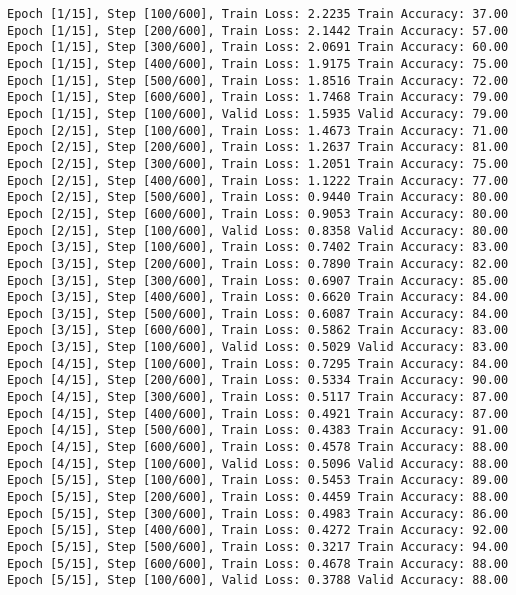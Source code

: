 \documentclass[11pt]{article}
\begin{document}
    \begin{Verbatim}[commandchars=\\\{\}]
Epoch [1/15], Step [100/600], Train Loss: 2.2235 Train Accuracy: 37.00
Epoch [1/15], Step [200/600], Train Loss: 2.1442 Train Accuracy: 57.00
Epoch [1/15], Step [300/600], Train Loss: 2.0691 Train Accuracy: 60.00
Epoch [1/15], Step [400/600], Train Loss: 1.9175 Train Accuracy: 75.00
Epoch [1/15], Step [500/600], Train Loss: 1.8516 Train Accuracy: 72.00
Epoch [1/15], Step [600/600], Train Loss: 1.7468 Train Accuracy: 79.00
Epoch [1/15], Step [100/600], Valid Loss: 1.5935 Valid Accuracy: 79.00
Epoch [2/15], Step [100/600], Train Loss: 1.4673 Train Accuracy: 71.00
Epoch [2/15], Step [200/600], Train Loss: 1.2637 Train Accuracy: 81.00
Epoch [2/15], Step [300/600], Train Loss: 1.2051 Train Accuracy: 75.00
Epoch [2/15], Step [400/600], Train Loss: 1.1222 Train Accuracy: 77.00
Epoch [2/15], Step [500/600], Train Loss: 0.9440 Train Accuracy: 80.00
Epoch [2/15], Step [600/600], Train Loss: 0.9053 Train Accuracy: 80.00
Epoch [2/15], Step [100/600], Valid Loss: 0.8358 Valid Accuracy: 80.00
Epoch [3/15], Step [100/600], Train Loss: 0.7402 Train Accuracy: 83.00
Epoch [3/15], Step [200/600], Train Loss: 0.7890 Train Accuracy: 82.00
Epoch [3/15], Step [300/600], Train Loss: 0.6907 Train Accuracy: 85.00
Epoch [3/15], Step [400/600], Train Loss: 0.6620 Train Accuracy: 84.00
Epoch [3/15], Step [500/600], Train Loss: 0.6087 Train Accuracy: 84.00
Epoch [3/15], Step [600/600], Train Loss: 0.5862 Train Accuracy: 83.00
Epoch [3/15], Step [100/600], Valid Loss: 0.5029 Valid Accuracy: 83.00
Epoch [4/15], Step [100/600], Train Loss: 0.7295 Train Accuracy: 84.00
Epoch [4/15], Step [200/600], Train Loss: 0.5334 Train Accuracy: 90.00
Epoch [4/15], Step [300/600], Train Loss: 0.5117 Train Accuracy: 87.00
Epoch [4/15], Step [400/600], Train Loss: 0.4921 Train Accuracy: 87.00
Epoch [4/15], Step [500/600], Train Loss: 0.4383 Train Accuracy: 91.00
Epoch [4/15], Step [600/600], Train Loss: 0.4578 Train Accuracy: 88.00
Epoch [4/15], Step [100/600], Valid Loss: 0.5096 Valid Accuracy: 88.00
Epoch [5/15], Step [100/600], Train Loss: 0.5453 Train Accuracy: 89.00
Epoch [5/15], Step [200/600], Train Loss: 0.4459 Train Accuracy: 88.00
Epoch [5/15], Step [300/600], Train Loss: 0.4983 Train Accuracy: 86.00
Epoch [5/15], Step [400/600], Train Loss: 0.4272 Train Accuracy: 92.00
Epoch [5/15], Step [500/600], Train Loss: 0.3217 Train Accuracy: 94.00
Epoch [5/15], Step [600/600], Train Loss: 0.4678 Train Accuracy: 88.00
Epoch [5/15], Step [100/600], Valid Loss: 0.3788 Valid Accuracy: 88.00

\end{Verbatim}
\end{document}
